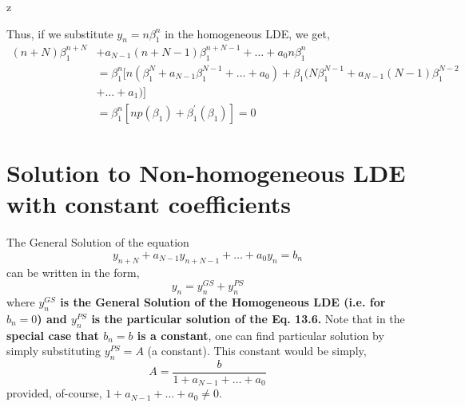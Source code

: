 z\documentclass[a4paper,12pt,twoside]{book}
\newcommand{\nll}[0]{\newline\newline}
\begin{document}
\begin{itemize}
{    \nll
    Thus, if we substitute $y_n = n\beta_1^n$ in the homogeneous LDE, we get,
    \begin{equation*}
        \begin{split}
            (n+N)\beta_1^{n+N} &+ a_{N-1} (n+N-1)\beta_1^{n+N-1} + \dots + a_0 n \beta_1^n \\
            &= \beta_1^n [ n(\beta_1^N + a_{N-1}\beta_1^{N-1} + \dots + a_0) + \beta_1(N\beta_1^{N-1} + a_{N-1}(N-1)\beta_1^{N-2} \\
            &+ \dots + a_1) ]\\
            &= \beta_1^n \left[ np(\beta_1) + \beta_1^\prime (\beta_1) \right] = 0
        \end{split}
    \end{equation*}
    }
\end{itemize}
\section{Solution to Non-homogeneous LDE with constant coefficients}
The General Solution of the equation 
\begin{equation}
    y_{n+N} + a_{N-1}y_{n+N-1} + \dots + a_0 y_n = b_n
\end{equation}
can be written in the form,
\[ y_n = y_n^{GS} + y_n^{PS} \]
where \textbf{$y_n^{GS}$ is the General Solution of the Homogeneous LDE (i.e. for $b_n = 0$) and $y_n^{PS}$ is the particular solution of the Eq. 13.6.}
\nll
Note that in the \textbf{special case that $b_n = b$ is a constant}, one can find particular solution by simply substituting $y_n^{PS} = A$ (a constant). This constant would be simply,
\[A= \frac{b}{1+a_{N-1} + \dots + a_0} \]
provided, of-course, $1+a_{N-1} + \dots + a_0 \neq 0$.
\end{document}

